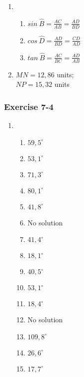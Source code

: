 {\begin{multicols}{3}
\begin{enumerate}[noitemsep, label=\textbf{\arabic*}. ]
\item %

     \begin{enumerate}[itemsep=1pt, label=\textbf{(\alph*)} ]
    \item $sin~\hat{B}=\frac{AC}{AB}=\frac{AD}{BD}$%
    \item $cos~\hat{D}=\frac{AD}{BD}=\frac{CD}{AD}$%
    \item $tan~\hat{B}=\frac{AC}{BC}=\frac{AD}{AB}$%
    \end{enumerate}

\item $MN=12,86$ units; \\$NP=15,32$ units %

\end{enumerate}

\subsubsection*{Exercise 7-4} %
   \begin{enumerate}[noitemsep, label=\textbf{\arabic*}. ] 
\item %
    \begin{enumerate}[noitemsep, label=\textbf{(\alph*)} ]
\item $59,5^{\circ}$%
\item $53,1^{\circ}$%
\item $71,3^{\circ}$%
\item $80,1^{\circ}$%
\item $41,8^{\circ}$%
\item No solution%
\item $41,4^{\circ}$%
\item $18,1^{\circ}$%
\item $40,5^{\circ}$%
\item $53,1^{\circ}$%
\item $18,4^{\circ}$%
\item No solution%
\item $109,8^{\circ}$%
\item $26,6^{\circ}$%
\item $17,7^{\circ}$%
\end{enumerate}


\end{enumerate}
\end{multicols}}

